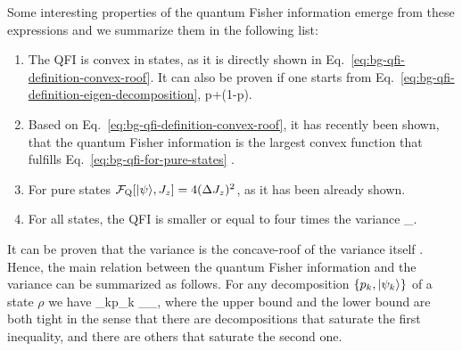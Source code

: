 Some interesting properties of the quantum Fisher information emerge from these expressions and we summarize them in the following list:
\begin{enumerate}
  \item The QFI is convex in states, as it is directly shown in Eq.~\eqref{eq:bg-qfi-definition-convex-roof}. It can also be proven if one starts from Eq.~\eqref{eq:bg-qfi-definition-eigen-decomposition},
  \be
    \leqslant p+(1-p).
  \ee
  \item Based on Eq.~\eqref{eq:bg-qfi-definition-convex-roof}, it has recently been shown, that the quantum Fisher information is the largest convex function that fulfills Eq.~\eqref{eq:bg-qfi-for-pure-states} \cite{Toth2013, Yu2013}.
  \item For pure states $\mathcal{F}_{\textnormal{Q}}[{\textstyle \vert{\psi}\rangle, J_z}] = 4(\Delta J_z )^2$, as it has been already shown.
  \item For all states, the QFI is smaller or equal to four times the variance \be
     _\rho.
  \ee
\end{enumerate}
It can be proven that the variance is the concave-roof of the variance itself \cite{Toth2013}.
Hence, the main relation between the quantum Fisher information and the variance can be summarized as follows.
For any decomposition $\{p_k, \vert{\psi_k}\rangle\}$ of a state $\rho$ we have
\be
  \leqslant \sum_{k}p_k _{}\leqslant {}_{\rho},
\ee
where the upper bound and the lower bound are both tight in the sense that there are decompositions that saturate the first inequality, and there are others that saturate the second one.

